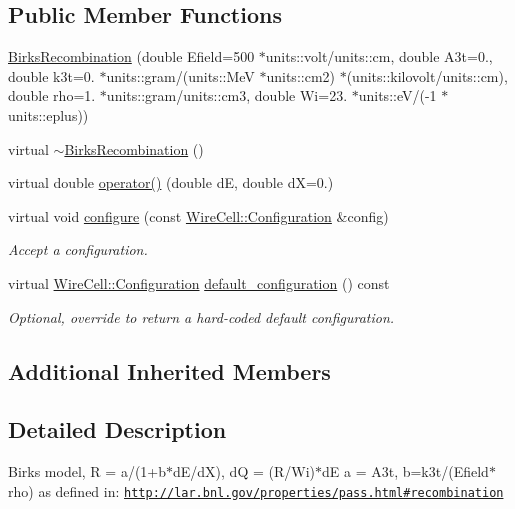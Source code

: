 \subsection*{Public Member Functions}
\begin{DoxyCompactItemize}
\item 
\hyperlink{class_wire_cell_1_1_gen_1_1_birks_recombination_aaad400ee5bb895a736dee173399e2f8c}{Birks\+Recombination} (double Efield=500 $\ast$units\+::volt/units\+::cm, double A3t=0., double k3t=0. $\ast$units\+::gram/(units\+::\+MeV $\ast$units\+::cm2) $\ast$(units\+::kilovolt/units\+::cm), double rho=1. $\ast$units\+::gram/units\+::cm3, double Wi=23. $\ast$units\+::eV/(-\/1 $\ast$units\+::eplus))
\item 
virtual \hyperlink{class_wire_cell_1_1_gen_1_1_birks_recombination_afb37f869c00a48b9f4497baad049b687}{$\sim$\+Birks\+Recombination} ()
\item 
virtual double \hyperlink{class_wire_cell_1_1_gen_1_1_birks_recombination_afc95474baf06138cf5d52245137a5fd8}{operator()} (double dE, double dX=0.)
\item 
virtual void \hyperlink{class_wire_cell_1_1_gen_1_1_birks_recombination_ad31fca3728b8815405db0f1ddb7d25ac}{configure} (const \hyperlink{namespace_wire_cell_a9f705541fc1d46c608b3d32c182333ee}{Wire\+Cell\+::\+Configuration} \&config)
\begin{DoxyCompactList}\small\item\em Accept a configuration. \end{DoxyCompactList}\item 
virtual \hyperlink{namespace_wire_cell_a9f705541fc1d46c608b3d32c182333ee}{Wire\+Cell\+::\+Configuration} \hyperlink{class_wire_cell_1_1_gen_1_1_birks_recombination_a8b05816264eceae54a5d56a9bee504ea}{default\+\_\+configuration} () const
\begin{DoxyCompactList}\small\item\em Optional, override to return a hard-\/coded default configuration. \end{DoxyCompactList}\end{DoxyCompactItemize}
\subsection*{Additional Inherited Members}


\subsection{Detailed Description}
Birks model, R = a/(1+b$\ast$d\+E/dX), dQ = (R/\+Wi)$\ast$dE a = A3t, b=k3t/(Efield$\ast$rho) as defined in\+: \href{http://lar.bnl.gov/properties/pass.html#recombination}{\tt http\+://lar.\+bnl.\+gov/properties/pass.\+html\#recombination} 

